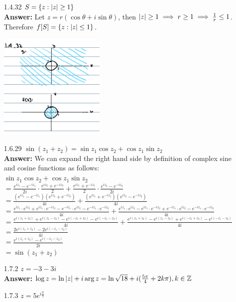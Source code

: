 \documentclass{article}
\begin{document}
\begin{itemize}
    \item [1.4.32] $S=\{z:\abs{z}\geq 1\}$\\
          \textbf{Answer: } Let $z=r(\cos\theta+i\sin\theta)$, then $\abs{z}\geq 1\implies r\geq 1\implies\frac{1}{r}\leq 1$. Therefore $f[S]=\{z:\abs{z}\leq 1\}$.
          \begin{center}
              \includegraphics[width=2in]{1-4-32.png}
          \end{center}
    \item [1.6.29] $\sin(z_1+z_2)=\sin z_1\cos z_2+\cos z_1\sin z_2$\\
          \textbf{Answer: } We can expand the right hand side by definition of complex sine and cosine functions as follows:\\$\sin z_1\cos z_2+\cos z_1\sin z_2$\\$=\frac{e^{iz_1}-e^{-iz_1}}{2i}\cdot\frac{e^{iz_2}+e^{-iz_2}}{2}+\frac{e^{iz_1}+e^{-iz_1}}{2}\cdot\frac{e^{iz_2}-e^{-iz_2}}{2i}$\\$=\frac{(e^{iz_1}-e^{-iz_1})(e^{iz_2}+e^{-iz_2})}{4i}+\frac{(e^{iz_1}+e^{-iz_1})(e^{iz_2}-e^{-iz_2})}{4i}$\\$=\frac{e^{iz_1}\cdot e^{iz_2}+e^{iz_1}\cdot e^{-iz_2}-e^{-iz_1}\cdot e^{iz_2}-e^{-iz_1}\cdot e^{-iz_2}}{4i}+\frac{e^{iz_1}\cdot e^{iz_2}-e^{iz_1}\cdot e^{-iz_2}+e^{-iz_1}\cdot e^{iz_2}-e^{-iz_1}\cdot e^{-iz_2}}{4i}$\\$=\frac{e^{i(z_1+z_2)}+e^{i(z_1-z_2)}-e^{i(-z_1+z_2)}-e^{i(-z_1-z_2)}}{4i}+\frac{e^{i(z_1+z_2)}-e^{i(z_1-z_2)}+e^{i(-z_1+z_2)}-e^{i(-z_1-z_2)}}{4i}$\\$=\frac{2e^{i(z_1+z_2)}-2e^{i(-z_1-z_2)}}{4i}$\\$=\frac{e^{i(z_1+z_2)}-e^{i(-z_1-z_2)}}{2i}$\\$=\sin(z_1+z_2)$
    \item [1.7.2] $z=-3-3i$\\
          \textbf{Answer: } $\log z=\ln\abs{z}+i\arg z=\ln\sqrt{18}+i(\frac{5\pi}{4}+2k\pi), k\in\mathbb{Z}$
    \item [1.7.3] $z=5e^{i\frac{\pi}{7}}$\\

\end{itemize}
\end{document}
